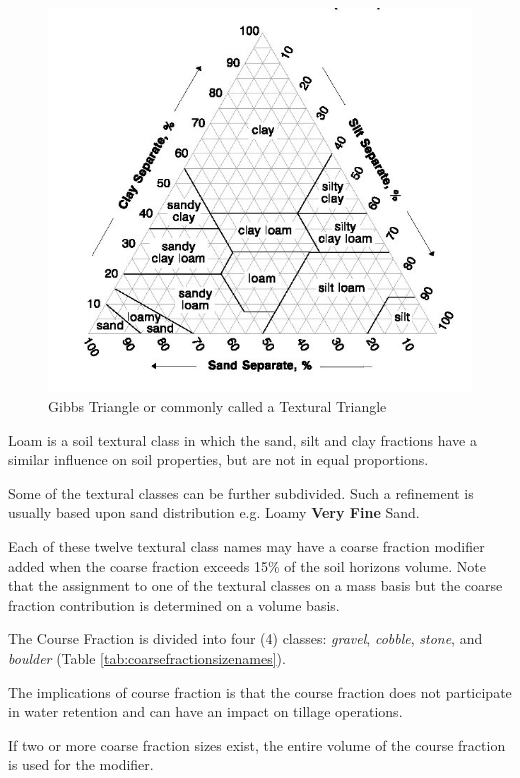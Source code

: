 \documentclass[letterpaper, 12pt]{article}
\begin{document}
\begin{figure}
    \centering
    \includegraphics{images/TexturalTriangle.jpg}
    \caption{Gibbs Triangle or commonly called a  Textural Triangle}
    \label{fig:TexturalTriangle}
\end{figure}
    
Loam is a soil textural class in which the sand, silt and clay fractions have a similar influence on soil properties, but are not in equal proportions.
    
Some of the textural classes can be further subdivided. Such a refinement is usually based upon sand distribution e.g. Loamy \textbf{Very Fine} Sand.
    
Each of these twelve textural class names may have a coarse fraction modifier added when the coarse fraction exceeds 15\% of the soil horizons volume. Note that the assignment to one of the textural classes on a mass basis but the coarse fraction contribution is determined on a volume basis.
    
The Course Fraction is divided into four (4) classes: \textit{gravel}, \textit{cobble}, \textit{stone}, and \textit{boulder} (Table \ref{tab:coarsefractionsizenames}).
    
The implications of course fraction is that the course fraction does not participate in water retention and can have an impact on tillage operations.
    
If two or more coarse fraction sizes exist, the entire volume of the course fraction is used for the modifier.
    
\end{document}
